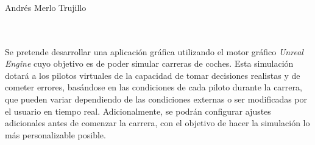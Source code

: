 \chapter*{}






\cleardoublepage
\thispagestyle{empty}

\begin{center}
{\large\bfseries \myTitle}\\
\end{center}
\begin{center}
Andrés Merlo Trujillo\\
\end{center}

\\

\vspace{0.7cm}
\\


Se pretende desarrollar una aplicación gráfica utilizando el motor gráfico \textit{Unreal Engine} cuyo objetivo es de poder simular carreras de coches. Esta simulación dotará a los pilotos virtuales de la capacidad de tomar decisiones realistas y de cometer errores, basándose en las condiciones de cada piloto durante la carrera, que pueden variar dependiendo de las condiciones externas o ser modificadas por el usuario en tiempo real. Adicionalmente, se podrán configurar ajustes adicionales antes de comenzar la carrera, con el objetivo de hacer la simulación lo más personalizable posible.

